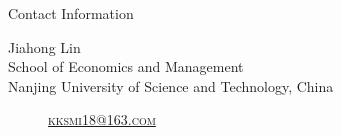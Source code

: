 \documentclass[
 size=14pt,
 paper=smartboard,  %
 mode=present, 		%
 display=slides, 	%
 style=tuliplab,  	%
 pauseslide,
 fleqn,leqno]{powerdot}
\begin{document}
\begin{wideslide}[toc=,bm=]{Contact Information}
\centering
{}
\twocolumn[
lcolwidth=0.35\linewidth,
rcolwidth=0.65\linewidth
]
{
}
{
Jiahong Lin\\
School of Economics and Management\\
Nanjing University of Science and Technology, China
\begin{description}
 \item[\textcolor{orange}{\faEnvelope}] \href{mailto:kksmi18@163.com}
 {\textsc{\footnotesize{kksmi18@163.com}}}


\end{description}
}
\end{wideslide}
\end{document}
